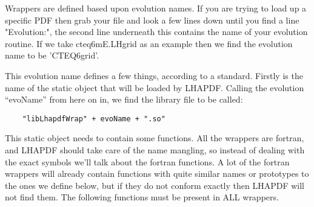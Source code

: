 Wrappers are defined based upon evolution names. If you are trying to load
up a specific PDF then grab your file and look a few lines down until you
find a line "Evolution:", the second line underneath this contains the name
of your evolution routine. If we take cteq6mE.LHgrid as an example then 
we find the evolution name to be 'CTEQ6grid'.

This evolution name defines a few things, according to a standard. Firstly
is the name of the static object that will be loaded by LHAPDF. Calling
the evolution ``evoName'' from here on in, we find the library file to be
called:

\begin{verbatim}
    "libLhapdfWrap" + evoName + ".so"
\end{verbatim}

This static object needs to contain some functions. All the wrappers are
fortran, and LHAPDF should take care of the name mangling, so instead of
dealing with the exact symbols we'll talk about the fortran functions.
A lot of the fortran wrappers will already contain functions with quite
similar names or prototypes to the ones we define below, but if they do not
conform exactly then LHAPDF will not find them. The following functions must
be present in ALL wrappers.

